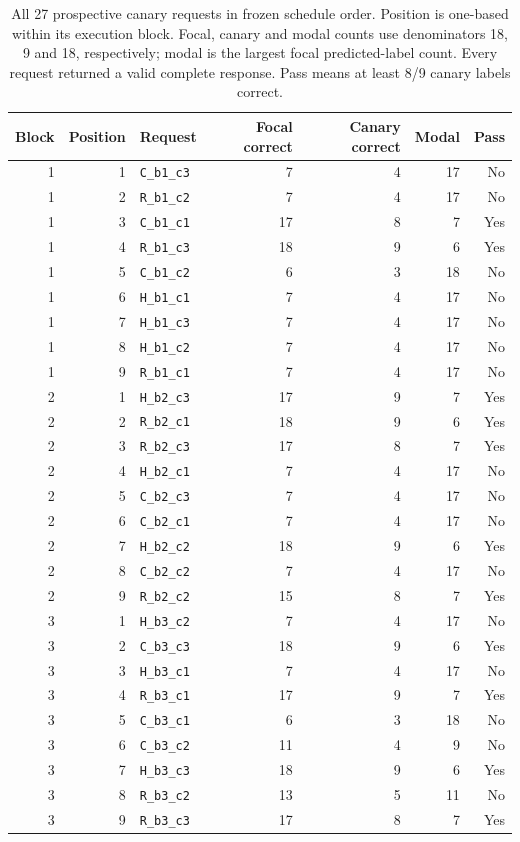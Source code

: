 \begin{table}[p]
\centering\small
\caption{All 27 prospective canary requests in frozen schedule order. Position is one-based within its execution block. Focal, canary and modal counts use denominators 18, 9 and 18, respectively; modal is the largest focal predicted-label count. Every request returned a valid complete response. Pass means at least 8/9 canary labels correct.}
\label{tab:canary_all_calls}
\begin{tabular}{@{}rrlrrrr@{}}\toprule
Block & Position & Request & Focal correct & Canary correct & Modal & Pass \\\midrule
1 & 1 & \texttt{C\_b1\_c3} & 7 & 4 & 17 & No \\
1 & 2 & \texttt{R\_b1\_c2} & 7 & 4 & 17 & No \\
1 & 3 & \texttt{C\_b1\_c1} & 17 & 8 & 7 & Yes \\
1 & 4 & \texttt{R\_b1\_c3} & 18 & 9 & 6 & Yes \\
1 & 5 & \texttt{C\_b1\_c2} & 6 & 3 & 18 & No \\
1 & 6 & \texttt{H\_b1\_c1} & 7 & 4 & 17 & No \\
1 & 7 & \texttt{H\_b1\_c3} & 7 & 4 & 17 & No \\
1 & 8 & \texttt{H\_b1\_c2} & 7 & 4 & 17 & No \\
1 & 9 & \texttt{R\_b1\_c1} & 7 & 4 & 17 & No \\
\midrule
2 & 1 & \texttt{H\_b2\_c3} & 17 & 9 & 7 & Yes \\
2 & 2 & \texttt{R\_b2\_c1} & 18 & 9 & 6 & Yes \\
2 & 3 & \texttt{R\_b2\_c3} & 17 & 8 & 7 & Yes \\
2 & 4 & \texttt{H\_b2\_c1} & 7 & 4 & 17 & No \\
2 & 5 & \texttt{C\_b2\_c3} & 7 & 4 & 17 & No \\
2 & 6 & \texttt{C\_b2\_c1} & 7 & 4 & 17 & No \\
2 & 7 & \texttt{H\_b2\_c2} & 18 & 9 & 6 & Yes \\
2 & 8 & \texttt{C\_b2\_c2} & 7 & 4 & 17 & No \\
2 & 9 & \texttt{R\_b2\_c2} & 15 & 8 & 7 & Yes \\
\midrule
3 & 1 & \texttt{H\_b3\_c2} & 7 & 4 & 17 & No \\
3 & 2 & \texttt{C\_b3\_c3} & 18 & 9 & 6 & Yes \\
3 & 3 & \texttt{H\_b3\_c1} & 7 & 4 & 17 & No \\
3 & 4 & \texttt{R\_b3\_c1} & 17 & 9 & 7 & Yes \\
3 & 5 & \texttt{C\_b3\_c1} & 6 & 3 & 18 & No \\
3 & 6 & \texttt{C\_b3\_c2} & 11 & 4 & 9 & No \\
3 & 7 & \texttt{H\_b3\_c3} & 18 & 9 & 6 & Yes \\
3 & 8 & \texttt{R\_b3\_c2} & 13 & 5 & 11 & No \\
3 & 9 & \texttt{R\_b3\_c3} & 17 & 8 & 7 & Yes \\
\bottomrule\end{tabular}
\end{table}
